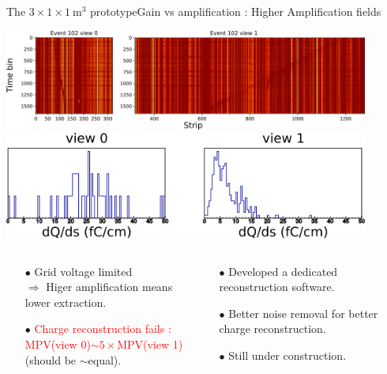 \documentclass[10pt]{beamer}
\begin{document}
    \begin{frame}{The \texorpdfstring{$3 \times 1 \times \SI{1}{\meter\cubed}$}{311} prototype}{Gain vs amplification : Higher Amplification fields}
    	\begin{scriptsize}
    		\centering
    		\includegraphics[width=0.9\textwidth]{figures/311/larsoft_track.png}\\
    		\includegraphics[width=0.9\textwidth]{figures/311/larsoft_dQds.png}\\
    		\vfill
    		\begin{columns}
    			\begin{column}{0.5\textwidth}
    				\begin{itemize}
    					\item[$\bullet$] Grid voltage limited\\ $\Rightarrow$ Higer amplification means lower extraction.
    					\item[$\bullet$] \textcolor{red}{Charge reconstruction fails : \\MPV(view 0)$\sim5\times$MPV(view 1)}\\(should be $\sim$equal).
    				\end{itemize}
    			\end{column}
    			\hfill
    			\begin{column}{0.5\textwidth}
    				\begin{itemize}
    					\item[$\bullet$] Developed a dedicated reconstruction software.
    					\item[$\bullet$] Better noise removal for better charge reconstruction.
    					\item[$\bullet$] Still under construction.
    				\end{itemize}
    			\end{column}
    		\end{columns}
    	\end{scriptsize}
    \end{frame}
    
\end{document}
